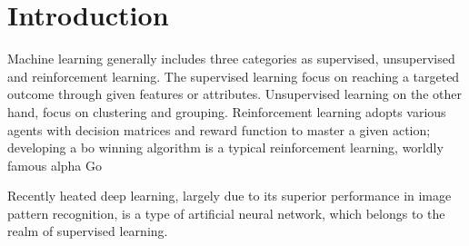 \section{Introduction}

Machine learning generally includes three categories as supervised, unsupervised and reinforcement learning. The supervised learning focus on reaching a targeted outcome through given features or attributes. Unsupervised learning on the other hand, focus on clustering and grouping. Reinforcement learning adopts various agents with decision matrices and reward function to master a given action; developing a bo winning algorithm is a typical reinforcement learning, worldly famous alpha Go
\par
Recently heated deep learning, largely due to its superior performance in image pattern recognition, is a type of artificial neural network, which belongs to the realm of supervised learning. 
